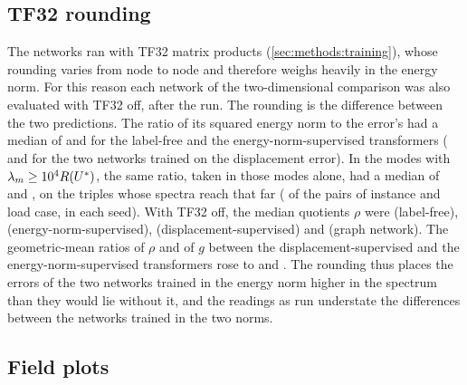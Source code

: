 \subsection{TF32 rounding}\label{app:repro:tf32}

The networks ran with TF32 matrix products (\cref{sec:methods:training}), whose rounding
varies from node to node and therefore weighs heavily in the energy norm. For this reason each network of the
two-dimensional comparison was also evaluated with TF32 off, after the run. The
rounding is the difference between the two predictions. The ratio of its squared energy norm
to the error's had a median of \numSpecTfFree{} and \numSpecTfKnorm{} for the label-free and
the energy-norm-supervised transformers (\numSpecTfLab{} and \numSpecTfMgn{} for the two
networks trained on the displacement error). In the modes with $\lambda_m\ge10^4R(U^{\ast})$,
the same ratio, taken in those modes alone, had a median of \numSpecTfStiffFree{} and
\numSpecTfStiffKnorm{}, on the \numSpecTfStiffN{} triples whose spectra reach that far
(\numSpecTfStiffLoads{} of the \numSpecLoadCases{} pairs of instance and load case, in each
seed). With TF32 off, the median quotients $\rho$ were \numSpecIeeeRqFree{} (label-free),
\numSpecIeeeRqKnorm{} (energy-norm-supervised), \numSpecIeeeRqLab{}
(displacement-supervised) and \numSpecIeeeRqMgn{} (graph network). The geometric-mean ratios of $\rho$ and of $g$ between the displacement-supervised and the
energy-norm-supervised transformers rose to \numSpecIeeeLabKnormRq{} and
\numSpecIeeeLabKnormGap{}. The rounding thus places the errors of the two networks trained
in the energy norm higher in the spectrum than they would lie without it, and the readings
as run understate the differences between the networks trained in the two norms.

\subsection{Field plots}\label{app:repro:plots}


